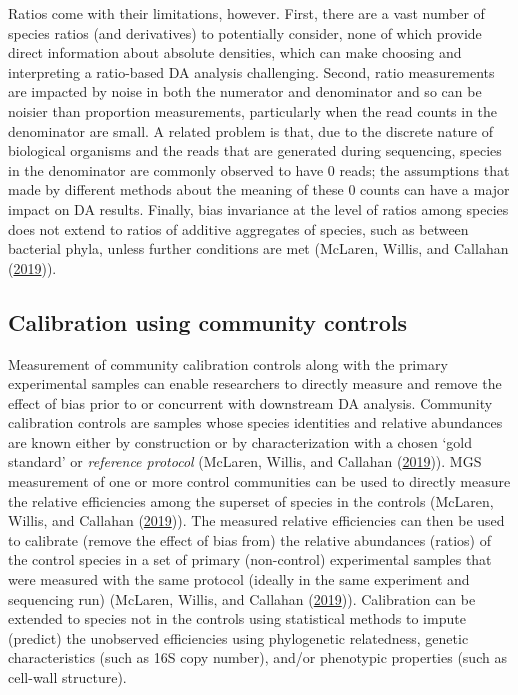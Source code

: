 \documentclass[
]{article}
\begin{document}
Ratios come with their limitations, however.
First, there are a vast number of species ratios (and derivatives) to potentially consider, none of which provide direct information about absolute densities, which can make choosing and interpreting a ratio-based DA analysis challenging.
Second, ratio measurements are impacted by noise in both the numerator and denominator and so can be noisier than proportion measurements, particularly when the read counts in the denominator are small.
A related problem is that, due to the discrete nature of biological organisms and the reads that are generated during sequencing, species in the denominator are commonly observed to have 0 reads; the assumptions that made by different methods about the meaning of these 0 counts can have a major impact on DA results.
Finally, bias invariance at the level of ratios among species does not extend to ratios of additive aggregates of species, such as between bacterial phyla, unless further conditions are met (McLaren, Willis, and Callahan (\protect\hyperlink{ref-mclaren2019cons}{2019})).

\hypertarget{calibrate-compositions}{%
\subsection{Calibration using community controls}\label{calibrate-compositions}}

Measurement of community calibration controls along with the primary experimental samples can enable researchers to directly measure and remove the effect of bias prior to or concurrent with downstream DA analysis.
Community calibration controls are samples whose species identities and relative abundances are known either by construction or by characterization with a chosen `gold standard' or \emph{reference protocol} (McLaren, Willis, and Callahan (\protect\hyperlink{ref-mclaren2019cons}{2019})).
MGS measurement of one or more control communities can be used to directly measure the relative efficiencies among the superset of species in the controls (McLaren, Willis, and Callahan (\protect\hyperlink{ref-mclaren2019cons}{2019})).
The measured relative efficiencies can then be used to calibrate (remove the effect of bias from) the relative abundances (ratios) of the control species in a set of primary (non-control) experimental samples that were measured with the same protocol (ideally in the same experiment and sequencing run) (McLaren, Willis, and Callahan (\protect\hyperlink{ref-mclaren2019cons}{2019})).
Calibration can be extended to species not in the controls using statistical methods to impute (predict) the unobserved efficiencies using phylogenetic relatedness, genetic characteristics (such as 16S copy number), and/or phenotypic properties (such as cell-wall structure).
\end{document}
